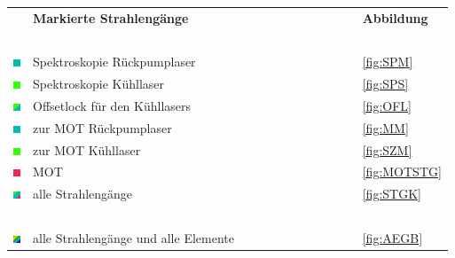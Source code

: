 \documentclass[
class=book,
accentcolor=1b,
custommargins=geometry,
fontsize=11pt,
thesis={type=Versuchsanleitung},
ruledheaders=all,
headline=false,
instbox=false,
marginpar=false,
title=small,
ignore-missing-data=true,
twoside=false,
logofile=apqdesign/tuda_logo.pdf,
pdfa=false %
]{apqpub}
\begin{document}
\begin{center}
~\\
~\\
~\\

\begin{tabular}{lll}
	& \textbf{Markierte Strahlengänge} & \textbf{Abbildung}\\
	& ~ & ~\\
	\includegraphics[width=8px]{graphics/Kaestchen/RL.jpg} & Spektroskopie Rückpumplaser & \ref{fig:SPM}\\
	\includegraphics[width=8px]{graphics/Kaestchen/SLS.jpg} & Spektroskopie Kühllaser & \ref{fig:SPS}\\
	\includegraphics[width=8px]{graphics/Kaestchen/OL.jpg} & Offsetlock für den Kühllasers ~~~~~~~~~~~~~~~~~~~~~~~~~ & \ref{fig:OFL}\\
	\includegraphics[width=8px]{graphics/Kaestchen/RL.jpg} & zur MOT Rückpumplaser & \ref{fig:MM}\\
	\includegraphics[width=8px]{graphics/Kaestchen/SLS.jpg} & zur MOT Kühllaser & \ref{fig:SZM}\\
	\includegraphics[width=8px]{graphics/Kaestchen/ML.jpg} & MOT & \ref{fig:MOTSTG}\\
	\includegraphics[width=8px]{graphics/Kaestchen/AS.jpg} & alle Strahlengänge & \ref{fig:STGK}\\
	& ~ & ~\\
	\includegraphics[width=8px]{graphics/Kaestchen/AM.jpg} & alle Strahlengänge und alle Elemente & \ref{fig:AEGB}
\end{tabular}
\end{center}
\end{document}
